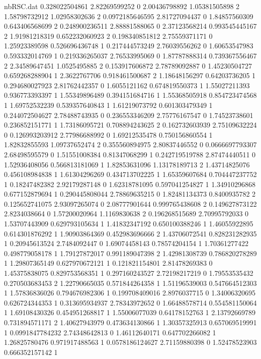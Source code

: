 \begin{filecontents}{nbRSC.dat}
0.328022504861 2.82269599252 0
2.00436798892 1.05381505898 2
1.58798732912 1.02958302636 2
0.0972185646595 2.81727094437 0
1.84857560309 0.643406568699 2
0.248900236511 2.88881588065 0
2.37123568214 0.993545445167 2
1.91981218319 0.652232060923 2
0.198340851812 2.75559371171 0
1.25923389598 0.526696436748 1
0.217444573249 2.76039556262 0
1.60653547983 0.593332014769 1
0.219336265037 2.76533995069 0
1.87787888314 0.739367556467 2
2.34589647451 1.0525495885 2
0.153917606872 2.78789092887 0
1.45230504727 0.659268288904 1
2.3622767706 0.918461500687 2
1.18648156297 0.64203736205 1
0.294680027923 2.81762442357 0
1.6055121162 0.674819550373 1
1.55027211393 0.936773393397 1
1.55349896489 0.394151684716 1
1.55368505918 0.854723474568 1
1.69752532239 0.539357640843 1
1.61219073792 0.601303479349 1
0.244072504627 2.78488743935 0
0.236553346209 2.75776167547 0
1.74523738601 0.236852151771 1
1.73186095721 0.708894243625 2
0.162732603939 2.75109632224 0
0.126993203912 2.77986688992 0
1.69212535478 0.750156860554 1
1.82832855593 1.09737652474 2
0.355560894975 2.80837446552 0
0.0666697793307 2.68498595579 0
1.51551008384 0.81347068299 1
0.242719519788 2.87474440511 0
1.52936408056 0.566813181069 1
1.82853631096 1.13178189713 2
1.43714825076 0.456108984838 1
1.61304296269 0.434713702225 1
1.65359607684 0.704447237752 1
0.18247482382 2.92179287148 0
1.62318781095 0.597041254827 1
1.34910296868 0.677152879694 1
0.290445808044 2.78869635215 0
1.82481134373 0.8400935782 2
0.125652741075 2.93097265074 0
2.08777901644 0.999765438608 2
0.149627873122 2.8234038664 0
1.57200020964 1.1169830638 2
0.196268515689 2.70995792033 0
1.53707443909 0.629793105634 1
1.41832347192 0.650100388246 1
1.46055922895 0.614301876292 1
1.90903864369 0.452983696666 2
1.43706072541 0.828231282935 1
0.20945613524 2.7484092447 0
1.69074458143 0.78574204154 1
1.70361277422 0.498779058178 1
1.79127872017 0.991189047398 2
1.42981308739 0.786820278289 1
1.29807365149 0.627970672121 1
0.121821154801 2.81478269383 0
1.45375838075 0.829753568351 1
0.297160243527 2.72198217219 0
1.79553535432 0.270503683453 2
1.22790665035 0.571844264358 1
1.51196539003 0.547664512303 1
1.57836836026 0.794676982306 1
0.199708409016 2.8976037715 0
1.34006320695 0.626724344353 1
0.313695934937 2.78343972652 0
1.66488578714 0.554581150064 1
1.69108430326 0.454951268817 1
1.55006077039 0.64178152763 1
2.13792669789 0.731894571171 2
1.40627943979 0.473634130866 1
1.30357325913 0.657069519991 1
0.0991847784232 2.74348642813 0
1.46112640171 0.647702266082 1
1.26825780476 0.971917488563 1
0.0578186124627 2.71159880398 0
1.52478523903 0.666352157142 1

\end{filecontents}
